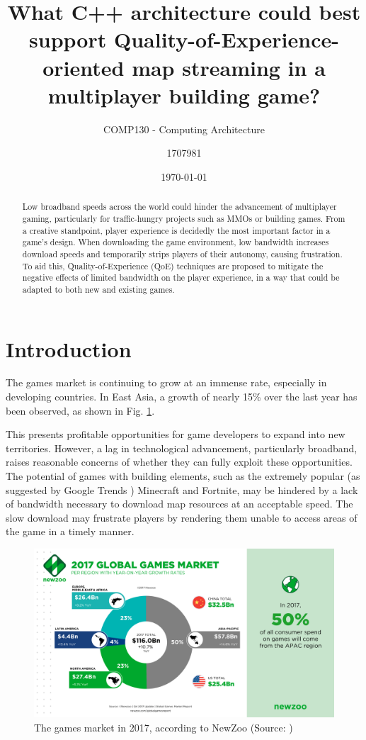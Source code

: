 \documentclass{scrartcl}
\title{What C++ architecture could best support Quality-of-Experience-oriented map streaming in a multiplayer building game?}
\subtitle{COMP130 - Computing Architecture}
\date{\today}
\author{1707981}
\begin{document}
\maketitle
{}

\begin{abstract}
Low broadband speeds across the world could hinder the advancement of multiplayer gaming, particularly for traffic-hungry projects such as MMOs or building games. From a creative standpoint, player experience is decidedly the most important factor in a game's design. When downloading the game environment, low bandwidth increases download speeds and temporarily strips players of their autonomy, causing frustration. To aid this, Quality-of-Experience (QoE) techniques are proposed to mitigate the negative effects of limited bandwidth on the player experience, in a way that could be adapted to both new and existing games.
\end{abstract}

\section{Introduction}
The games market is continuing to grow at an immense rate, especially in developing countries. In East Asia, a growth of nearly 15\% over the last year has been observed, as shown in Fig. \ref{fig:market}.

This presents profitable opportunities for game developers to expand into new territories. However, a lag in technological advancement, particularly broadband, raises reasonable concerns of whether they can fully exploit these opportunities. The potential of games with building elements, such as the extremely popular (as suggested by Google Trends \cite{minecraftnite}) Minecraft and Fortnite, may be hindered by a lack of bandwidth necessary to download map resources at an acceptable speed. The slow download may frustrate players by rendering them unable to access areas of the game in a timely manner.

\begin{figure}[H]
	\centering
	\includegraphics[width=0.75\linewidth]{Newzoo_2017_Global_Games_Market.png}
	\caption{The games market in 2017, according to NewZoo (Source: \cite{globalmarketpic})}
	\label{fig:market}
\end{figure}
\end{document}
